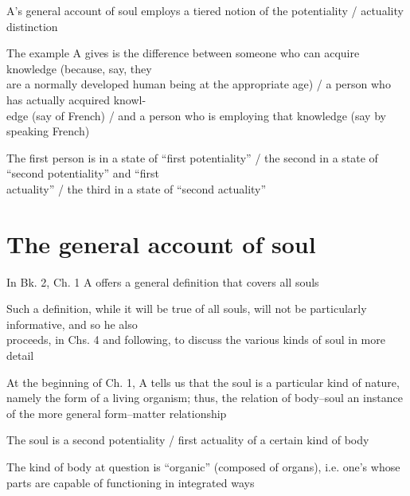 \documentclass[11pt]{article}
\begin{document}
\noindent A's general account of soul employs a tiered notion of the potentiality / actuality distinction
\vspace*{2mm}

The example A gives is the difference between someone who can acquire knowledge (because, say, they\\\hspace*{6mm}are a normally developed human being at the appropriate age) / a person who has actually acquired knowl-\\\hspace*{6mm}edge (say of French) / and a person who is employing that knowledge (say by speaking French)
\vspace*{2mm}

The first person is in a state of ``first potentiality'' / the second in a state of ``second potentiality'' and ``first\\\hspace*{6mm}actuality'' / the third in a state of ``second actuality''
\vspace*{-1mm}

\section*{The general account of soul}

\noindent In Bk. 2, Ch. 1 A offers a general definition that covers all souls
\vspace*{2mm}

Such a definition, while it will be true of all souls, will not be particularly informative, and so he also\\\hspace*{6mm}proceeds, in Chs. 4 and following, to discuss the various kinds of soul in more detail 
\vspace*{2mm}

\noindent At the beginning of Ch. 1, A tells us that the soul is a particular kind of nature, namely the form of a living organism; thus, the relation of body--soul an instance of the more general form--matter relationship
\vspace*{2mm}

\noindent The soul is a second potentiality / first actuality of a certain kind of body
\vspace*{2mm}

\noindent The kind of body at question is ``organic'' (composed of organs), i.e. one's whose parts are capable of functioning in integrated ways
\vspace*{2mm}
\end{document}
